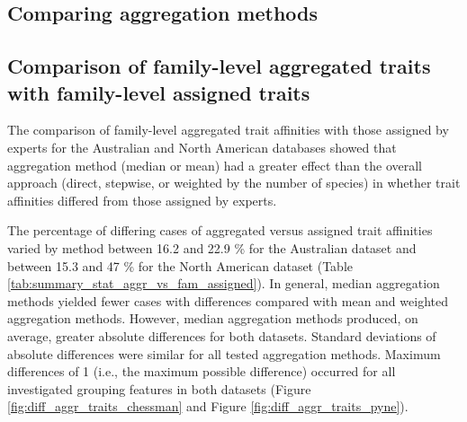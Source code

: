 \documentclass{article}
\begin{document}

\subsection*{Comparing aggregation methods} 

\subsection*{Comparison of family-level aggregated traits with family-level assigned traits}
\label{sec:diff_trait_agg_chessman}


The comparison of family-level aggregated trait affinities with those assigned by experts for the Australian and North American databases showed that aggregation method (median or mean) had a greater effect than the overall approach (direct, stepwise, or weighted by the number of species) in whether trait affinities differed from those assigned by experts.

The percentage of differing cases of aggregated versus assigned trait affinities varied by method between 16.2 and 22.9 \% for the Australian dataset and between 15.3 and 47 \% for the North American dataset (Table \ref{tab:summary_stat_aggr_vs_fam_assigned}). In general, median aggregation methods yielded fewer cases with differences compared with mean and weighted aggregation methods. However, median aggregation methods produced, on average, greater absolute differences for both datasets. Standard deviations of absolute differences were similar for all tested aggregation methods. Maximum differences of 1 (i.e., the maximum possible difference) occurred for all investigated grouping features in both datasets (Figure \ref{fig:diff_aggr_traits_chessman} and Figure \ref{fig:diff_aggr_traits_pyne}).
\end{document}
